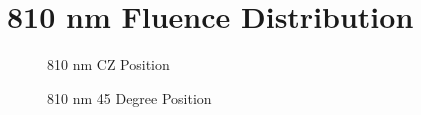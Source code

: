 \documentclass[journal,twoside,web]{ieeecolor}
\begin{document}
\section{810 nm Fluence Distribution}
\label{app:810Simulations}
\begin{figure}[htb!]
    \caption{\label{fig:810-CZ} 810 nm CZ Position}
\end{figure}

\begin{figure}[htb!]
    \caption{\label{fig:810-45} 810 nm 45 Degree Position}
\end{figure}
\end{document}
